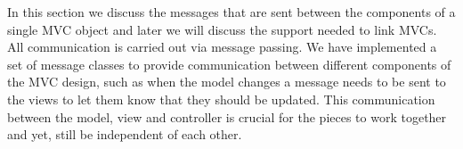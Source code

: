 \documentclass[11pt]{article}
\newcommand{\Rfunction}[1]{{\textsf{#1}}}
\newcommand{\Rclass}[1]{\texttt{#1}}
\begin{document}
In this section we discuss the messages that are sent between the
components of a single MVC object and later we will discuss the
support needed to link MVCs.  All communication is carried out via
message passing. We have implemented a set of message classes to
provide communication between different components of the MVC design,
such as when the model changes a message needs to be sent to the views
to let them know that they should be updated.  This communication
between the model, view and controller is crucial for the pieces to
work together and yet, still be independent of each other.




\end{document}
